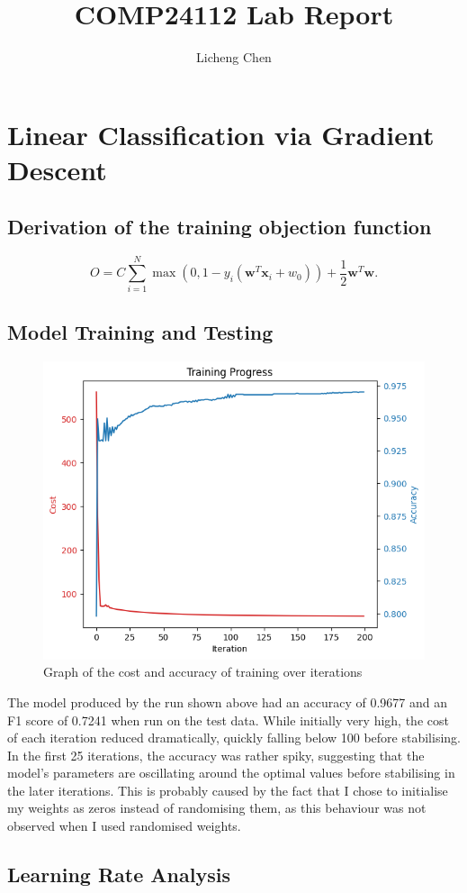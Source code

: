 \documentclass[a4paper]{article}
\title{COMP24112 Lab Report}
\author{Licheng Chen}
\begin{document}
\maketitle

\section{Linear Classification via Gradient Descent}

\subsection{Derivation of the training objection function}

$$O = C \sum^N_{i=1}\max\left(0, 1 - y_i \left(\mathbf{w}^T\mathbf{x}_i + w_0\right)\right) + \frac{1}{2}\mathbf{w}^T\mathbf{w}. $$


\newpage
\subsection{Model Training and Testing}
\begin{figure}[htbp]
    \centering
    \includegraphics[width=0.5\linewidth]{1.1.png}
    \caption{\centering Graph of the cost and accuracy of training over iterations}
\end{figure}

The model produced by the run shown above had an accuracy of 0.9677 and an F1 score of 0.7241 when run on the test data. While initially very high, the cost of each iteration reduced dramatically, quickly falling below 100 before stabilising. In the first 25 iterations, the accuracy was rather spiky, suggesting that the model's parameters are oscillating around the optimal values before stabilising in the later iterations. This is probably caused by the fact that I chose to initialise my weights as zeros instead of randomising them, as this behaviour was not observed when I used randomised weights.

\subsection{Learning Rate Analysis}
\end{document}
